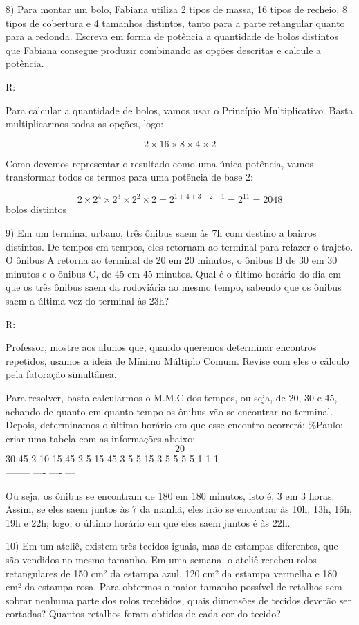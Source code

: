 8) Para montar um bolo, Fabiana utiliza 2 tipos de massa, 16 tipos de
recheio, 8 tipos de cobertura e 4 tamanhos distintos, tanto para a parte
retangular quanto para a redonda. Escreva em forma de potência a
quantidade de bolos distintos que Fabiana consegue produzir combinando
as opções descritas e calcule a potência.

R:

Para calcular a quantidade de bolos, vamos usar o Princípio
Multiplicativo. Basta multiplicarmos todas as opções, logo:

\[2 \times 16 \times 8 \times 4 \times 2\]

Como devemos representar o resultado como uma única potência, vamos
transformar todos os termos para uma potência de base 2:

\[2 \times 2^{4} \times 2^{3} \times 2^{2} \times 2 = 2^{1 + 4 + 3 + 2 + 1} = 2^{11} = 2048\]
bolos distintos

9) Em um terminal urbano, três ônibus saem às 7h com destino a bairros
distintos. De tempos em tempos, eles retornam ao terminal para refazer o
trajeto. O ônibus A retorna ao terminal de 20 em 20 minutos, o ônibus B
de 30 em 30 minutos e o ônibus C, de 45 em 45 minutos. Qual é o último
horário do dia em que os três ônibus saem da rodoviária ao mesmo tempo,
sabendo que os ônibus saem a última vez do terminal às 23h?

R:

Professor, mostre aos alunos que, quando queremos determinar encontros
repetidos, usamos a ideia de Mínimo Múltiplo Comum. Revise com eles o
cálculo pela fatoração simultânea.

Para resolver, basta calcularmos o M.M.C dos tempos, ou seja, de 20, 30
e 45, achando de quanto em quanto tempo os ônibus vão se encontrar no
terminal. Depois, determinamos o último horário em que esse encontro
ocorrerá: \%Paulo: criar uma tabela com as informações abaixo: --------
---- ---- --- \[20\] 30 45 2 10 15 45 2 5 15 45 3 5 5 15 3 5 5 5 5 1 1
1\\
-------- ---- ---- ---

Ou seja, os ônibus se encontram de 180 em 180 minutos, isto é, 3 em 3
horas. Assim, se eles saem juntos às 7 da manhã, eles irão se encontrar
às 10h, 13h, 16h, 19h e 22h; logo, o último horário em que eles saem
juntos é às 22h.

10) Em um ateliê, existem três tecidos iguais, mas de estampas
diferentes, que são vendidos no mesmo tamanho. Em uma semana, o ateliê
recebeu rolos retangulares de 150 cm² da estampa azul, 120 cm² da
estampa vermelha e 180 cm² da estampa rosa. Para obtermos o maior
tamanho possível de retalhos sem sobrar nenhuma parte dos rolos
recebidos, quais dimensões de tecidos deverão ser cortadas? Quantos
retalhos foram obtidos de cada cor do tecido?

